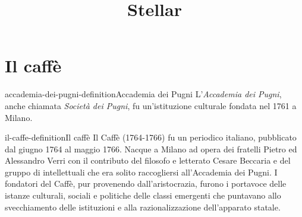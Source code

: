 \documentclass[preview]{standalone}
\begin{document}
\title{Stellar}
\genpage

\section{Il caffè}

\begin{snippetdefinition}{accademia-dei-pugni-definition}{Accademia dei Pugni}
    L'\textit{Accademia dei Pugni}, anche chiamata \textit{Società dei Pugni},
    fu un'istituzione culturale fondata nel 1761 a Milano.
\end{snippetdefinition}

\begin{snippetdefinition}{il-caffe-definition}{Il caffè}
    Il Caffè (1764-1766) fu un periodico italiano, pubblicato dal giugno 1764 al maggio 1766.
    Nacque a Milano ad opera dei fratelli Pietro ed Alessandro Verri con il contributo del
    filosofo e letterato Cesare Beccaria e del gruppo di intellettuali che era solito raccogliersi
    all'Accademia dei Pugni. I fondatori del Caffè, pur provenendo dall'aristocrazia,
    furono i portavoce delle istanze culturali, sociali e politiche delle classi emergenti che
    puntavano allo svecchiamento delle istituzioni e alla razionalizzazione dell'apparato statale.
\end{snippetdefinition}

\end{document}
